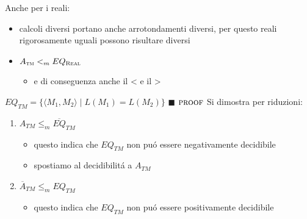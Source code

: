 \documentclass[
                        12pt, %
                        a4paper, %
                        oneside, %
                        headinclude,footinclude, %
                        BCOR5mm, %
                  ]{scrartcl}
\begin{document}
Anche per i reali:
\begin{itemize}
\item calcoli diversi portano anche arrotondamenti diversi, per questo reali rigorosamente uguali possono risultare diversi
\item \(A_{\textsc{tm}}<_m EQ_{\textsc{Real}}\)
\begin{itemize}
\item e di conseguenza anche il < e il >
\end{itemize}
\end{itemize}



\(EQ_{TM} = \{\langle M_{1}, M_{2} \rangle \mid L(M_{1}) = L(M_{2})\}\)
\(\blacksquare\)
\(\textsc{proof}\)    Si dimostra per riduzioni:
\begin{enumerate}
\item \(A_{TM} \le_{m} \overline{EQ}_{TM}\)
\begin{itemize}
\item questo indica che \(EQ_{TM}\) non puó essere negativamente decidibile
\item spostiamo al decidibilitá a \(A_{TM}\)
\end{itemize}
\item \(\overline A_{TM} \le_{m} EQ_{TM}\)
\begin{itemize}
\item questo indica che \(EQ_{TM}\) non puó essere positivamente decidibile
\end{itemize}
\end{enumerate}
\end{document}
